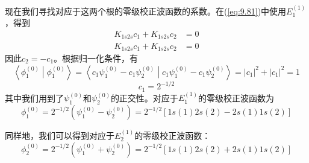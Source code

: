     现在我们寻找对应于这两个根的零级校正波函数的系数。在(\ref{eq:9.81})中使用$E_{1}^{\left(1\right)}$，得到
    \begin{equation*}
        \begin{aligned}
            K_{1s2s}c_1 + K_{1s2s}c_2 &= 0 \\
            K_{1s2s}c_1 + K_{1s2s}c_2 &= 0
        \end{aligned}
    \end{equation*}
    因此$c_2 = -c_1$。根据归一化条件，有
    \begin{equation*}
        \left\langle \phi_1^{(0)} \middle| \phi_1^{(0)} \right\rangle = \left\langle c_1 \psi_1^{(0)} - c_1 \psi_2^{(0)} \middle| c_1 \psi_1^{(0)} - c_1 \psi_2^{(0)} \right\rangle = |c_1|^2 + |c_1|^2 = 1
    \end{equation*}
    \begin{equation*}
        c_1 = 2^{-1/2}
    \end{equation*}
    其中我们用到了$\psi_1^{(0)}$和$\psi_2^{(0)}$的正交性。对应于$E_1^{(1)}$的零级校正波函数为
    \begin{equation}
        \phi_{1}^{(0)} = 2^{-1/2} \left(\psi_{1}^{(0)} - \psi_{2}^{(0)}\right) = 2^{-1/2} \left[ 1s(1)2s(2) - 2s(1)1s(2) \right]
        \label{eq:9.103}
    \end{equation}

    同样地，我们可以得到对应于$E_2^{(1)}$的零级校正波函数：
    \begin{equation}
        \phi_{2}^{(0)} = 2^{-1/2} \left(\psi_{1}^{(0)} + \psi_{2}^{(0)}\right) = 2^{-1/2} \left[ 1s(1)2s(2) + 2s(1)1s(2) \right]
        \label{eq:9.104}
    \end{equation}

